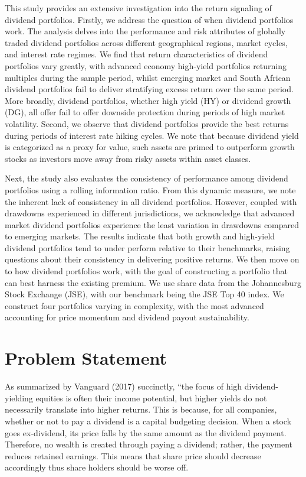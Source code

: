 \documentclass[12pt,preprint, authoryear]{elsarticle}
\numberwithin{equation}{section}
\numberwithin{figure}{section}
\numberwithin{table}{section}
\begin{document}
This study provides an extensive investigation into the return signaling
of dividend portfolios. Firstly, we address the question of when
dividend portfolios work. The analysis delves into the performance and
risk attributes of globally traded dividend portfolios across different
geographical regions, market cycles, and interest rate regimes. We find
that return characteristics of dividend portfolios vary greatly, with
advanced economy high-yield portfolios returning multiples during the
sample period, whilst emerging market and South African dividend
portfolios fail to deliver stratifying excess return over the same
period. More broadly, dividend portfolios, whether high yield (HY) or
dividend growth (DG), all offer fail to offer downside protection during
periods of high market volatility. Second, we observe that dividend
portfolios provide the best returns during periods of interest rate
hiking cycles. We note that because dividend yield is categorized as a
proxy for value, such assets are primed to outperform growth stocks as
investors move away from risky assets within asset classes.

Next, the study also evaluates the consistency of performance among
dividend portfolios using a rolling information ratio. From this dynamic
measure, we note the inherent lack of consistency in all dividend
portfolios. However, coupled with drawdowns experienced in different
jurisdictions, we acknowledge that advanced market dividend portfolios
experience the least variation in drawdowns compared to emerging
markets. The results indicate that both growth and high-yield dividend
portfolios tend to under perform relative to their benchmarks, raising
questions about their consistency in delivering positive returns. We
then move on to how dividend portfolios work, with the goal of
constructing a portfolio that can best harness the existing premium. We
use share data from the Johannesburg Stock Exchange (JSE), with our
benchmark being the JSE Top 40 index. We construct four portfolios
varying in complexity, with the most advanced accounting for price
momentum and dividend payout sustainability.

\newpage

\hypertarget{problem-statement}{%
\section{Problem Statement}\label{problem-statement}}

As summarized by Vanguard (2017) succinctly, ``the focus of high
dividend-yielding equities is often their income potential, but higher
yields do not necessarily translate into higher returns. This is
because, for all companies, whether or not to pay a dividend is a
capital budgeting decision. When a stock goes ex-dividend, its price
falls by the same amount as the dividend payment. Therefore, no wealth
is created through paying a dividend; rather, the payment reduces
retained earnings. This means that share price should decrease
accordingly thus share holders should be worse off.
\end{document}
